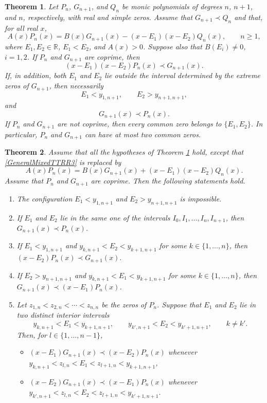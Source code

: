 \documentclass[10pt,a4paper]{amsart}
\newtheorem{theorem}{Theorem}
\begin{document}
\begin{theorem}\label{MainTheorem3} Let $P_n$, $G_{n+1}$, and $Q_n$ be monic polynomials of degrees $n$, $n+1$, and $n$, respectively, with real and simple zeros. Assume that $G_{n+1}\prec Q_n$ and that, for all real $x$, \begin{equation} A(x)P_n(x) = B(x)G_{n+1}(x) - (x-E_1)(x-E_2)Q_n(x), \qquad n\geq1, \label{GeneralMixedTTRR3} \end{equation} where $E_1,E_2\in\mathbb{R}$, $E_1<E_2$, and $A(x)>0$. Suppose also that $B(E_i)\neq0$, $ i=1,2$. If $P_n$ and $G_{n+1}$ are coprime, then \[ (x-E_1)(x-E_2)P_n(x)\prec G_{n+1}(x). \] If, in addition, both $E_1$ and $E_2$ lie outside the interval determined by the extreme zeros of $G_{n+1}$, then necessarily \[ E_1<y_{1,n+1}, \qquad E_2>y_{n+1,n+1}, \] and \[ G_{n+1}(x)\prec P_n(x). \] If $P_n$ and $G_{n+1}$ are not coprime, then every common zero belongs to $\{E_1,E_2\}$. In particular, $P_n$ and $G_{n+1}$ can have at most two common zeros. \end{theorem} 

\begin{theorem}\label{MainTheorem4} Assume that all the hypotheses of Theorem \ref{MainTheorem3} hold, except that \eqref{GeneralMixedTTRR3} is replaced by \begin{equation} A(x)P_n(x) = B(x)G_{n+1}(x) + (x-E_1)(x-E_2)Q_n(x). \label{GeneralMixedTTRR4} \end{equation} Assume that $P_n$ and $G_{n+1}$ are coprime. Then the following statements hold. \begin{enumerate} \item[(a)] The configuration $ E_1<y_{1,n+1}$ and $E_2>y_{n+1,n+1} $ is impossible. \item[(b)] If $E_1$ and $E_2$ lie in the same one of the intervals $I_0,I_1,\ldots,I_n,I_{n+1}$, then $G_{n+1}(x)\prec P_n(x)$. \item[(c)] If $ E_1<y_{1,n+1} $ and $ y_{k,n+1}<E_2<y_{k+1,n+1} $ for some $k\in\{1,\ldots,n\}$, then $(x-E_2)P_n(x)\prec G_{n+1}(x).$ \item[(d)] If $E_2>y_{n+1,n+1}$ and $y_{k,n+1}<E_1<y_{k+1,n+1}$ for some $k\in\{1,\ldots,n\}$, then \newline $G_{n+1}(x)\prec (x-E_1)P_n(x)$. 
\item[(e)] Let $z_{1,n}<z_{2,n}<\cdots<z_{n,n}$ be the zeros of $P_n$.   Suppose that $E_1$ and $E_2$ lie in two distinct interior intervals \[ y_{k,n+1}<E_1<y_{k+1,n+1}, \qquad y_{k',n+1}<E_2<y_{k'+1,n+1}, \qquad k\neq k'. \] Then, for $l\in\{1,\ldots,n-1\}$, \begin{itemize}\item[(i)]    $(x-E_1)G_{n+1}(x)\prec (x-E_2)P_n(x)$  whenever $
				y_{k,n+1} < z_{l,n} < E_1 < z_{l+1,n} < y_{k+1,n+1}
				$, 
				\item[(ii)] $(x-E_2)G_{n+1}(x)\prec (x-E_1)P_n(x)$  whenever $
				y_{k',n+1} < z_{l,n} < E_2< z_{l+1,n} < y_{k'+1,n+1}$. 
			\end{itemize}\end{enumerate} \end{theorem} 
\end{document}
